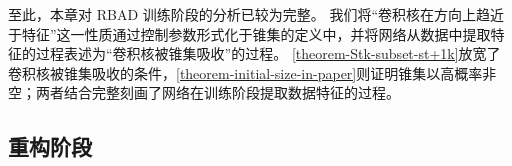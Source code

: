 



至此，本章对 RBAD 训练阶段的分析已较为完整。
我们将“卷积核在方向上趋近于特征”这一性质通过控制参数形式化于锥集的定义中，并将网络从数据中提取特征的过程表述为“卷积核被锥集吸收”的过程。
\cref{theorem-Stk-subset-st+1k}放宽了卷积核被锥集吸收的条件，\cref{theorem-initial-size-in-paper}则证明锥集以高概率非空；两者结合完整刻画了网络在训练阶段提取数据特征的过程。

\subsection{重构阶段}\label{sec-reconstruction-phase}

